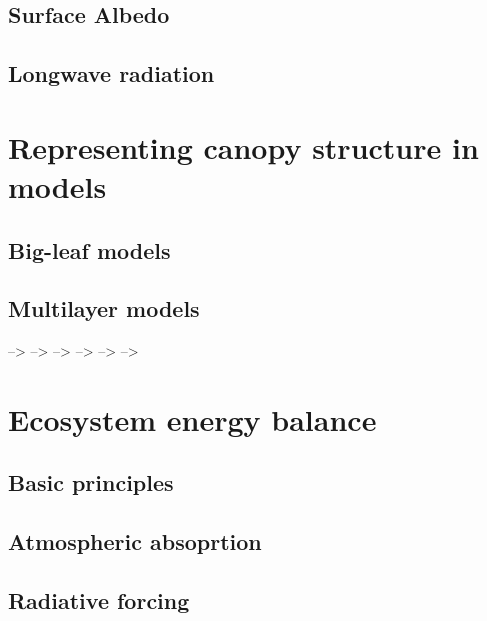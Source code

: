 \documentclass[
  oneside]{book}
\begin{document}
\hypertarget{surface-albedo}{%
\subsection{Surface Albedo}\label{surface-albedo}}

\hypertarget{longwave-radiation}{%
\subsection{Longwave radiation}\label{longwave-radiation}}

\hypertarget{representing-canopy-structure-in-models}{%
\section{Representing canopy structure in models}\label{representing-canopy-structure-in-models}}

\hypertarget{big-leaf-models}{%
\subsection{Big-leaf models}\label{big-leaf-models}}

\hypertarget{multilayer-models}{%
\subsection{Multilayer models}\label{multilayer-models}}

--\textgreater{}
--\textgreater{}
--\textgreater{}
--\textgreater{}
--\textgreater{}
--\textgreater{}

\hypertarget{ecosystem-energy-balance}{%
\section{Ecosystem energy balance}\label{ecosystem-energy-balance}}

\hypertarget{basic-principles}{%
\subsection{Basic principles}\label{basic-principles}}

\hypertarget{atmospheric-absoprtion}{%
\subsection{Atmospheric absoprtion}\label{atmospheric-absoprtion}}

\hypertarget{radiative-forcing}{%
\subsection{Radiative forcing}\label{radiative-forcing}}
\end{document}
